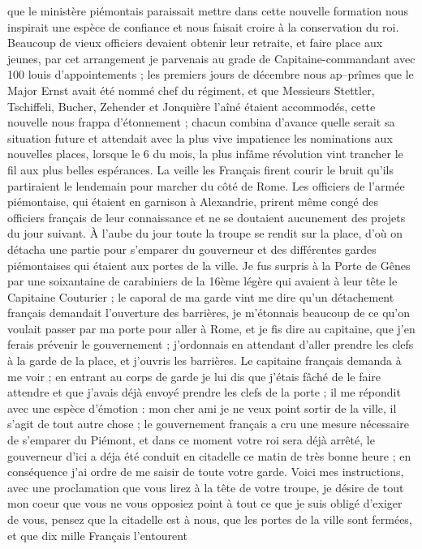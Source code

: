 \documentclass[12pt]{article}
\begin{document}
 que le ministère piémontais paraissait mettre dans cette
nouvelle formation nous inspirait une espèce de confiance et nous faisait croire à la conservation
du roi. Beaucoup de vieux officiers devaient obtenir leur retraite, et faire place aux jeunes, par
cet arrangement je parvenais au grade de Capitaine-commandant avec 100 louis d’appointements ; les
premiers jours de décembre nous ap–prîmes que le Major Ernst avait été nommé chef du régiment, et
que Messieurs Stettler, Tschiffeli, Bucher, Zehender et Jonquière l’aîné étaient accommodés, cette
nouvelle nous frappa d’étonnement ; chacun combina d’avance quelle serait sa situation future et
attendait avec la plus vive impatience les nominations aux nouvelles places, lorsque le 6 du mois,
la plus infâme révolution vint trancher le fil aux plus belles espérances. La veille les Français
firent courir le bruit qu’ils partiraient le lendemain pour marcher du côté de Rome. Les officiers
de l’armée piémontaise, qui étaient en garnison à Alexandrie, prirent même congé des officiers
français de leur connaissance et ne se doutaient aucunement des projets du jour suivant. À l’aube du
jour toute la troupe se rendit sur la place, d’où on détacha une partie pour s’emparer du gouverneur
et des différentes gardes piémontaises qui étaient aux portes de la ville. Je fus surpris à la Porte
de Gênes par une soixantaine de carabiniers de la 16ème légère qui avaient à leur tête le Capitaine
Couturier ; le caporal de ma garde vint me dire qu’un détachement français demandait l’ouverture des
barrières, je m’étonnais beaucoup de ce qu’on voulait passer par ma porte pour aller à Rome, et je
fis dire au capitaine, que j’en ferais prévenir le gouvernement ; j’ordonnais en attendant d’aller
prendre les clefs à la garde de la place, et j’ouvris les barrières. Le capitaine français demanda à
me voir ; en entrant au corps de garde je lui dis que j’étais fâché de le faire attendre et que
j’avais déjà envoyé prendre les clefs de la porte ; il me répondit avec une espèce d’émotion : mon
cher ami je ne veux point sortir de la ville, il s’agit de tout autre chose ; le gouvernement
français a cru une mesure nécessaire de s’emparer du Piémont, et dans ce moment votre roi sera déjà
arrêté, le gouverneur d’ici a déja été conduit en citadelle ce matin de très bonne heure ; en
conséquence j’ai ordre de me saisir de toute votre garde. Voici mes instructions, avec une
proclamation que vous lirez à la tête de votre troupe, je désire de tout mon coeur que vous ne vous
opposiez point à tout ce que je suis obligé d’exiger de vous, pensez que la citadelle est à nous,
que les portes de la ville sont fermées, et que dix mille Français l’entourent
\end{document}
